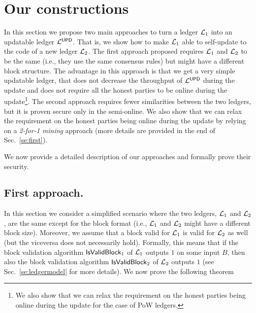 \section{Our constructions}
In this section we propose two main approaches to turn a ledger $\mathcal{L}_1$ into an updatable ledger $\mathcal{L}^\mathsf{UPD}$. That is, we show how to make $\mathcal{L}_1$ able to self-update to the code of a new ledger $\mathcal{L}_2$.
The first approach proposed requires $\mathcal{L}_1$ and $\mathcal{L}_2$ to be the same (i.e.,  they use the same consensus rules) but might have a different block structure. The advantage in this approach is that we get a very simple updatable ledger, that does not decrease the throughput of  $\mathcal{L}^\mathsf{UPD}$ during the update and does not require all the honest parties to be online during the update\footnote{We also show that we can relax the requirement on the honest parties being online during the update for the case of PoW ledgers.}. 
The second approach requires fewer similarities between the two ledgers, but it is proven secure only in the semi-online. We also show that we can relax the requirement on the honest parties being online during the update by relying on a \emph{2-for-1 mining} approach (more details are provided in the end of Sec.~\ref{se:first}).

We now provide a detailed description of our approaches and formally prove their security.




\subsection{First approach.}
In this section we consider a simplified scenario where the two ledgers, $\mathcal{L}_1$ and $\mathcal{L}_2$, 
are the same except for the block format (i.e., $\mathcal{L}_1$ and $\mathcal{L}_2$ might have a different block size).
Moreover, we assume that a block valid for $\mathcal{L}_1$ is valid for $\mathcal{L}_2$ as well (but the viceversa does not necessarily hold). Formally, this means that if the block validation algorithm  $\mathsf{IsValidBlock}_1$ of $\mathcal{L}_1$
outputs $1$ on some input $B$, then also the block validation algorithm $\mathsf{IsValidBlock}_2$ of $\mathcal{L}_2$ outputs $1$ (see Sec.~\ref{se:ledgermodel} for more details).
We now prove the following theorem


